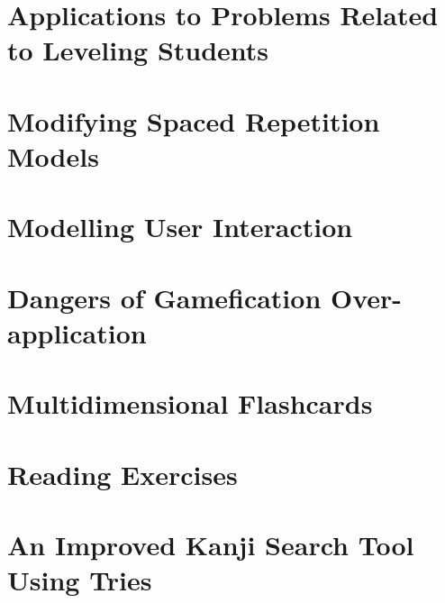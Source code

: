 \section{Applications to Problems Related to Leveling Students}
\section{Modifying Spaced Repetition Models}
\section{Modelling User Interaction}
\section{Dangers of Gamefication Over-application}
\section{Multidimensional Flashcards}
\section{Reading Exercises}
\section{An Improved Kanji Search Tool Using Tries}